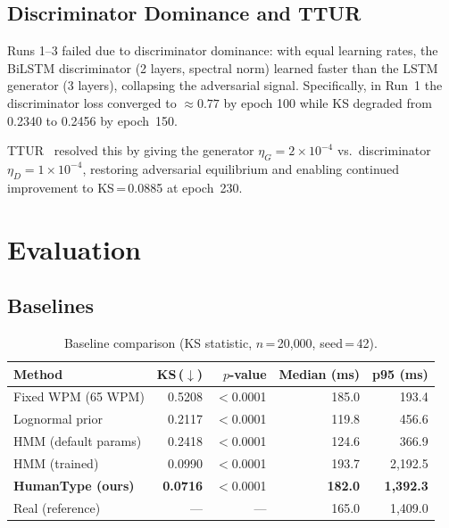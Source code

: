 \documentclass[sigconf,nonacm]{acmart}
\begin{document}
\subsection{Discriminator Dominance and TTUR}

Runs 1--3 failed due to discriminator dominance: with equal learning rates,
the BiLSTM discriminator (2 layers, spectral norm) learned faster than the
LSTM generator (3 layers), collapsing the adversarial signal.
Specifically, in Run~1 the discriminator loss converged to $\approx 0.77$
by epoch 100 while KS degraded from 0.2340 to 0.2456 by epoch~150.

TTUR~\cite{heusel2017ttur} resolved this by giving the generator
$\eta_G = 2 \times 10^{-4}$ vs.\ discriminator $\eta_D = 1 \times 10^{-4}$,
restoring adversarial equilibrium and enabling continued improvement to
KS\,=\,0.0885 at epoch~230.


\section{Evaluation}

\subsection{Baselines}

\begin{table}[t]
\centering\small
\caption{Baseline comparison (KS statistic, $n$\,=\,20{,}000, seed\,=\,42).}
\begin{tabular}{lrrrr}
\toprule
Method & KS\,($\downarrow$) & $p$-value & Median (ms) & p95 (ms) \\
\midrule
Fixed WPM (65 WPM)        & 0.5208 & $<$0.0001 & 185.0 & 193.4 \\
Lognormal prior           & 0.2117 & $<$0.0001 & 119.8 & 456.6 \\
HMM (default params)      & 0.2418 & $<$0.0001 & 124.6 & 366.9 \\
HMM (trained)             & 0.0990 & $<$0.0001 & 193.7 & 2{,}192.5 \\
\textbf{HumanType (ours)} & \textbf{0.0716} & $<$0.0001 & \textbf{182.0} & \textbf{1{,}392.3} \\
\midrule
Real (reference)          & — & — & 165.0 & 1{,}409.0 \\
\bottomrule
\end{tabular}
\label{tab:baseline}
\end{table}
\end{document}
